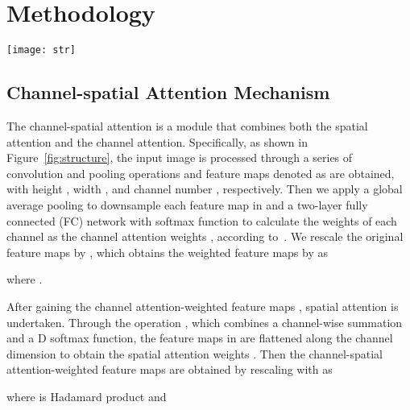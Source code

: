 \documentclass{article}
\begin{document}
\section{Methodology}

\begin{figure*}[!t]
    \centering 
    \texttt{[image: str]}  
    \vspace{-8mm}
    \caption{The framework of our attention module. The upper line (from left to right) and the bottom line (from right to left) present the forward and the gradient backpropagation processes, respectively. A symmetrical Kullback-Leibler (KL) divergence between the weights of each channel in forward propagation and the weights of each feature map in the Grad-CAM is utilized as the loss function in backpropagation to supervise the channel-spatial attention.}\label{fig:structure}
\end{figure*}



\subsection{Channel-spatial Attention Mechanism}

The channel-spatial attention is a module that combines both the spatial attention and the channel attention. Specifically, as shown in Figure~\ref{fig:structure}, the input image is processed through a series of convolution and pooling operations  and feature maps denoted as  are obtained, with height , width , and channel number , respectively. Then we apply a global average pooling  to downsample each feature map in  and a two-layer fully connected (FC) network  with softmax function to calculate the weights of each channel as the channel attention weights , according to~\cite{SENet}. We rescale the original feature maps  by , which obtains the weighted feature maps  by  as



\noindent where .

After gaining the channel attention-weighted feature maps , spatial attention is undertaken. Through the operation , which combines a channel-wise summation and a D softmax function, the feature maps in  are flattened along the channel dimension to obtain the spatial attention weights . Then the channel-spatial attention-weighted feature maps  are obtained by rescaling  with  as 



\noindent where  is Hadamard product and
\end{document}
